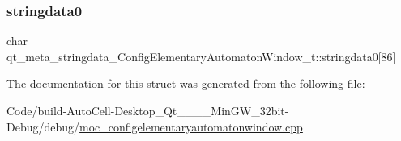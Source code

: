 \subsubsection{\texorpdfstring{stringdata0}{stringdata0}}
{\footnotesize\ttfamily char qt\+\_\+meta\+\_\+stringdata\+\_\+\+Config\+Elementary\+Automaton\+Window\+\_\+t\+::stringdata0\mbox{[}86\mbox{]}}



The documentation for this struct was generated from the following file\+:\begin{DoxyCompactItemize}
\item 
Code/build-\/\+Auto\+Cell-\/\+Desktop\+\_\+\+Qt\+\_\+\_\+\_\+\_\+\+Min\+G\+W\+\_\+32bit-\/\+Debug/debug/\mbox{\hyperlink{moc__configelementaryautomatonwindow_8cpp}{moc\+\_\+configelementaryautomatonwindow.\+cpp}}\end{DoxyCompactItemize}
